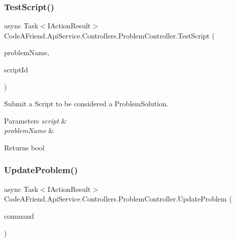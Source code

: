 \subsubsection{\texorpdfstring{Test\+Script()}{TestScript()}}
{\footnotesize\ttfamily async Task$<$I\+Action\+Result$>$ Code\+A\+Friend.\+Api\+Service.\+Controllers.\+Problem\+Controller.\+Test\+Script (\begin{DoxyParamCaption}\item[{string}]{problem\+Name,  }\item[{Guid}]{script\+Id }\end{DoxyParamCaption})}



Submit a Script to be considered a Problem\+Solution. 


\begin{DoxyParams}{Parameters}
{\em script} & \\
\hline
{\em problem\+Name} & \\
\hline
\end{DoxyParams}
\begin{DoxyReturn}{Returns}
bool
\end{DoxyReturn}
\mbox{\label{class_code_a_friend_1_1_api_service_1_1_controllers_1_1_problem_controller_a3ae37d2a578e67e48c1b1a91894c61b0}} 
\subsubsection{\texorpdfstring{Update\+Problem()}{UpdateProblem()}}
{\footnotesize\ttfamily async Task$<$I\+Action\+Result$>$ Code\+A\+Friend.\+Api\+Service.\+Controllers.\+Problem\+Controller.\+Update\+Problem (\begin{DoxyParamCaption}\item[{\mbox{\hyperlink{class_code_a_friend_1_1_data_model_1_1_user_1_1_update_problem_command}{User.\+Update\+Problem\+Command}}}]{command }\end{DoxyParamCaption})}




